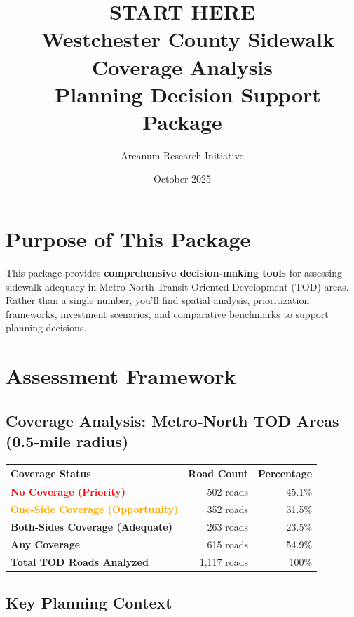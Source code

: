 \documentclass[11pt,letterpaper]{article}
\title{\textbf{START HERE}\\\
\large Westchester County Sidewalk Coverage Analysis\\\
Planning Decision Support Package}
\author{Arcanum Research Initiative}
\date{October 2025}
\begin{document}
\maketitle

\section*{Purpose of This Package}

This package provides \textbf{comprehensive decision-making tools} for assessing sidewalk adequacy in Metro-North Transit-Oriented Development (TOD) areas. Rather than a single number, you'll find spatial analysis, prioritization frameworks, investment scenarios, and comparative benchmarks to support planning decisions.

\vspace{1em}

\section*{Assessment Framework}

\subsection*{Coverage Analysis: Metro-North TOD Areas (0.5-mile radius)}

\begin{table}[h]
\centering
\begin{tabular}{@{}lrr@{}}
\toprule
\textbf{Coverage Status} & \textbf{Road Count} & \textbf{Percentage} \\
\midrule
\textcolor{red}{\textbf{No Coverage (Priority)}} & 502 roads & 45.1\% \\
\textcolor{orange}{\textbf{One-Side Coverage (Opportunity)}} & 352 roads & 31.5\% \\
\textcolor{green!70!black}{\textbf{Both-Sides Coverage (Adequate)}} & 263 roads & 23.5\% \\
\midrule
\textbf{Any Coverage} & 615 roads & 54.9\% \\
\textbf{Total TOD Roads Analyzed} & 1,117 roads & 100\% \\
\bottomrule
\end{tabular}
\end{table}

\subsection*{Key Planning Context}
\end{document}
